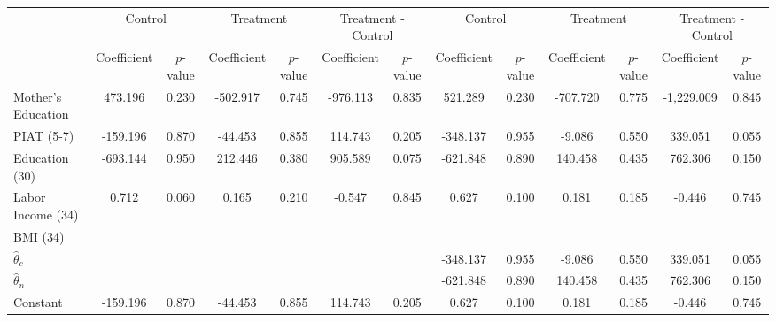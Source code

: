\begin{tabular}{lcccccccccccc} \toprule
&\multicolumn{2}{c}{Control} & \multicolumn{2}{c}{Treatment} & \multicolumn{2}{c}{Treatment - Control} & \multicolumn{2}{c}{Control} & \multicolumn{2}{c}{Treatment} & \multicolumn{2}{c}{Treatment - Control} \\
 & Coefficient  & $p$-value  & Coefficient  & $p$-value & Coefficient  & $p$-value  & Coefficient  & $p$-value  & Coefficient  & $p$-value  & Coefficient  & $p$-value \\ \midrule
Mother's Education &   473.196 &     0.230 &  -502.917 &     0.745 &  -976.113 &     0.835 &   521.289 &     0.230 &  -707.720 &     0.775 & -1,229.009 &     0.845 \\  
PIAT (5-7) &  -159.196 &     0.870 &   -44.453 &     0.855 &   114.743 &     0.205 &  -348.137 &     0.955 &    -9.086 &     0.550 &   339.051 &     0.055 \\  
Education (30) &  -693.144 &     0.950 &   212.446 &     0.380 &   905.589 &     0.075 &  -621.848 &     0.890 &   140.458 &     0.435 &   762.306 &     0.150 \\  
Labor Income (34) &     0.712 &     0.060 &     0.165 &     0.210 &    -0.547 &     0.845 &     0.627 &     0.100 &     0.181 &     0.185 &    -0.446 &     0.745 \\  
BMI (34)  &         &         &         &         &         &         &         &         &         &         &         &          \\  
$\hat{\theta}_{c}$ &         &         &         &         &         &         &  -348.137 &     0.955 &    -9.086 &     0.550 &   339.051 &     0.055 \\  
$\hat{\theta}_{n}$ &         &         &         &         &         &         &  -621.848 &     0.890 &   140.458 &     0.435 &   762.306 &     0.150 \\  
Constant &  -159.196 &     0.870 &   -44.453 &     0.855 &   114.743 &     0.205 &     0.627 &     0.100 &     0.181 &     0.185 &    -0.446 &     0.745 \\  
\bottomrule  \end{tabular}
